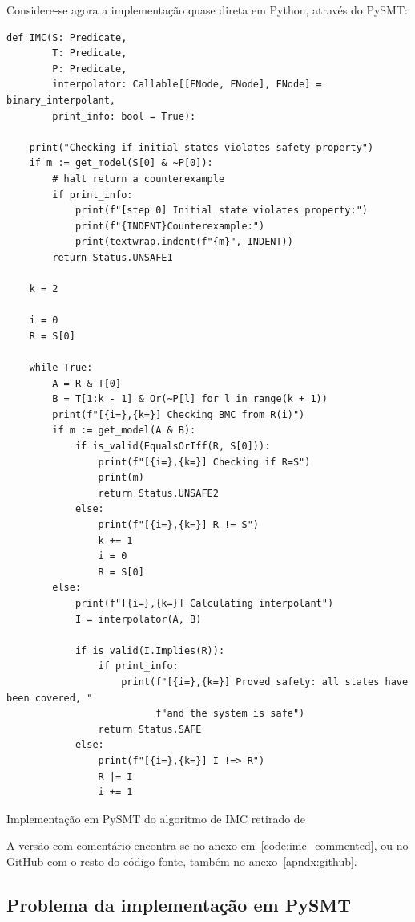 \documentclass[11pt,a4paper]{report}%
\newenvironment{code}{\captionsetup{type=listing}}{}
\begin{document}
Considere-se agora a implementação quase direta em Python, através do PySMT:

\begin{code}
\begin{verbatim}
def IMC(S: Predicate,
        T: Predicate,
        P: Predicate,
        interpolator: Callable[[FNode, FNode], FNode] = binary_interpolant,
        print_info: bool = True):

    print("Checking if initial states violates safety property")
    if m := get_model(S[0] & ~P[0]):
        # halt return a counterexample
        if print_info:
            print(f"[step 0] Initial state violates property:")
            print(f"{INDENT}Counterexample:")
            print(textwrap.indent(f"{m}", INDENT))
        return Status.UNSAFE1

    k = 2

    i = 0
    R = S[0]

    while True:
        A = R & T[0]
        B = T[1:k - 1] & Or(~P[l] for l in range(k + 1))
        print(f"[{i=},{k=}] Checking BMC from R(i)")
        if m := get_model(A & B):
            if is_valid(EqualsOrIff(R, S[0])):
                print(f"[{i=},{k=}] Checking if R=S")
                print(m)
                return Status.UNSAFE2
            else:
                print(f"[{i=},{k=}] R != S")
                k += 1
                i = 0
                R = S[0]
        else:
            print(f"[{i=},{k=}] Calculating interpolant")
            I = interpolator(A, B)

            if is_valid(I.Implies(R)):
                if print_info:
                    print(f"[{i=},{k=}] Proved safety: all states have been covered, "
                          f"and the system is safe")
                return Status.SAFE
            else:
                print(f"[{i=},{k=}] I !=> R")
                R |= I
                i += 1
\end{verbatim}
\caption{Implementação em PySMT do algoritmo de IMC retirado de \cite{interpolation_thesis}}
\label{code:imc}
\end{code}

A versão com comentário encontra-se no anexo em~\ref{code:imc_commented}, ou no GitHub com
o resto do código fonte, também no anexo~\ref{apndx:github}.

\subsection{Problema da implementação em PySMT}
\label{imc:problem}
\end{document}
